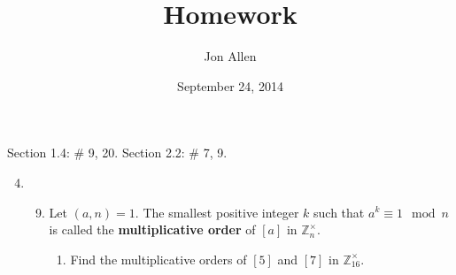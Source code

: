 \documentclass[letterpaper]{article}
\begin{document}
\title{Homework}
\date{September 24, 2014}
\author{Jon Allen}
\maketitle
Section 1.4: \# 9, 20.
Section 2.2: \# 7, 9.
\renewcommand{\labelenumi}{1.\arabic{enumi}}
\renewcommand{\labelenumii}{\arabic{enumii}.}
\renewcommand{\labelenumiii}{(\alph{enumiii})}
\begin{enumerate}
\setcounter{enumi}{3}
\item
  \begin{enumerate}
  \setcounter{enumii}{8}
  \item
    Let $(a,n)=1$. The smallest positive integer $k$ such that $a^k\equiv 1 \mod n$ is called the {\bfseries multiplicative order} of $[a]$ in $\mathbb{Z}_n^\times$.
    \begin{enumerate}
    \item
      Find the multiplicative orders of $[5]$ and $[7]$ in $\mathbb{Z}_{16}^\times$.


\end{enumerate}
\end{enumerate}
\end{enumerate}
\end{document}
